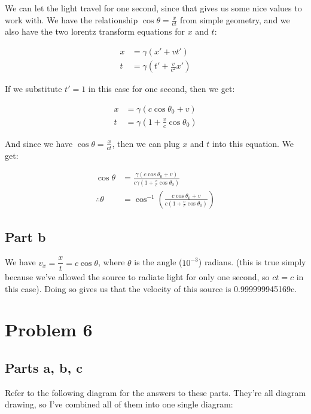 \documentclass{article}
\theoremstyle{definition}
\numberwithin{equation}{section}
\numberwithin{definition}{section}
\begin{document}
	We can let the light travel for one second, since that gives us some nice values to work with. We have the relationship $\cos \theta = \frac{x}{ct}$ from simple geometry, and we also have the two lorentz transform equations for $x$ and $t$:
	
	\begin{align*}
		x &= \gamma(x' + vt')\\
		t &= \gamma\left(t' + \frac{v}{c^2}x'\right)
	\end{align*}
	
	If we substitute $t' = 1$ in this case for one second, then we get: 
	
	\begin{align*}
		x &= \gamma(c \cos \theta_0 + v)\\
		t &= \gamma\left(1 + \frac{v}{c} \cos \theta_0\right)
	\end{align*}

	And since we have $\cos \theta = \frac{x}{ct}$, then we can plug $x$ and $t$ into this equation. We get:
	
	\begin{align*}
		\cos \theta &= \frac{\gamma(c \cos \theta_0 + v)}{c\gamma \left(1 + \frac{v}{c} \cos \theta_0\right)}\\
		\therefore \theta &= \cos^{-1}\left(\frac{c \cos \theta_0 + v}{c(1 + \frac{v}{c} \cos \theta_0)}\right)
	\end{align*}
	
	\subsection{Part b}
	
	We have $v_x = \dfrac{x}{t} = c \cos \theta$, where $\theta$ is the angle ($10^{-3}$) radians. (this is true simply because we've allowed the source to radiate light for only one second, so $ct = c$ in this case). Doing so gives us that the velocity of this source is 0.999999945169c.
	
	\section{Problem 6}
	
	\subsection{Parts a, b, c}
	
	Refer to the following diagram for the answers to these parts. They're all diagram drawing, so I've combined all of them into one single diagram: 
	
\end{document}
